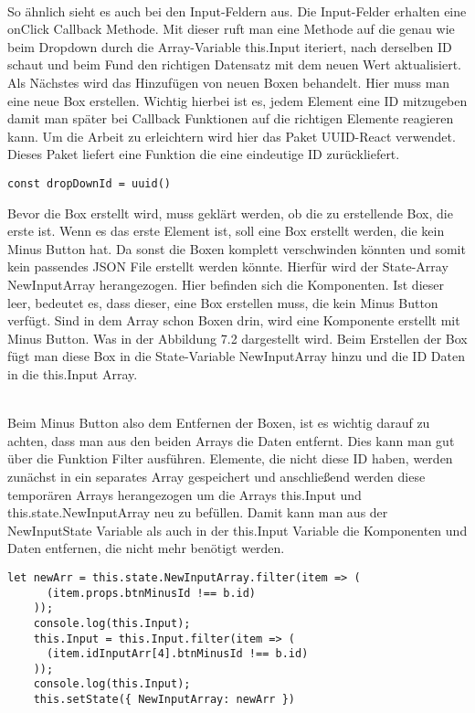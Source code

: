 \documentclass[a4paper,11pt]{scrreprt}
\begin{document}
\\
So ähnlich sieht es auch bei den Input-Feldern aus. Die Input-Felder erhalten eine onClick Callback Methode. Mit dieser ruft man eine Methode auf die genau wie beim Dropdown durch die Array-Variable this.Input iteriert, nach derselben ID schaut und beim Fund den richtigen Datensatz mit dem neuen Wert aktualisiert. 
\\
Als Nächstes wird das Hinzufügen von neuen Boxen behandelt. Hier muss man eine neue Box erstellen. Wichtig hierbei ist es, jedem Element eine ID mitzugeben damit man später bei Callback Funktionen auf die richtigen Elemente reagieren kann. Um die Arbeit zu erleichtern wird hier das Paket UUID-React verwendet. Dieses Paket liefert eine Funktion die eine eindeutige ID zurückliefert. 
\begin{lstlisting}
const dropDownId = uuid()
\end{lstlisting}
Bevor die Box erstellt wird, muss geklärt werden, ob die zu erstellende Box, die erste ist. 
Wenn es das erste Element ist, soll eine Box erstellt werden, die kein Minus Button hat.
Da sonst die Boxen komplett verschwinden könnten und somit kein passendes JSON File erstellt werden könnte.  Hierfür wird der State-Array NewInputArray herangezogen. Hier befinden sich die Komponenten. Ist dieser leer, bedeutet es, dass dieser, eine Box erstellen muss, die kein Minus Button verfügt. Sind in dem Array schon Boxen drin, wird eine Komponente erstellt mit Minus Button. Was in der Abbildung 7.2 dargestellt wird.  
Beim Erstellen der Box fügt man diese Box in die State-Variable NewInputArray hinzu und die ID Daten in die this.Input Array.
 
\\
Beim Minus Button also dem Entfernen der Boxen, ist es wichtig darauf zu achten, dass man aus den beiden Arrays die Daten entfernt. Dies kann man gut über die Funktion Filter ausführen. Elemente, die nicht diese ID haben, werden zunächst in ein separates Array gespeichert und anschließend werden diese temporären Arrays herangezogen um die Arrays this.Input und this.state.NewInputArray neu zu befüllen.
Damit kann man aus der NewInputState Variable als auch in der this.Input Variable die Komponenten und Daten entfernen, die nicht mehr benötigt werden.
\hfill \break
\hfill \break
\hfill \break
\hfill \break
\begin{lstlisting}
let newArr = this.state.NewInputArray.filter(item => (
      (item.props.btnMinusId !== b.id)
    ));
    console.log(this.Input);
    this.Input = this.Input.filter(item => (
      (item.idInputArr[4].btnMinusId !== b.id)
    ));
    console.log(this.Input);
    this.setState({ NewInputArray: newArr })
\end{lstlisting}
\end{document}

